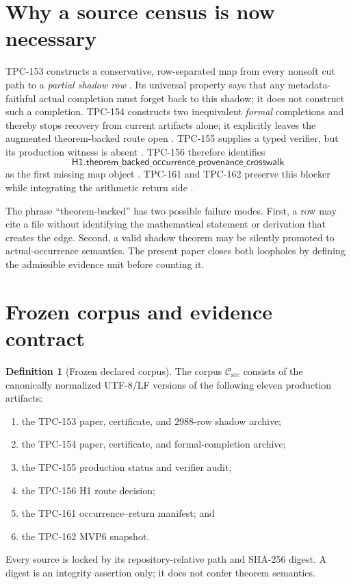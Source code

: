 \documentclass[11pt]{article}
\theoremstyle{definition}
\newtheorem{definition}[theorem]{Definition}
\theoremstyle{remark}
\newcommand{\Csrc}{\mathcal C_{\mathrm{src}}}
\begin{document}
\section{Why a source census is now necessary}

TPC-153 constructs a conservative, row-separated map from every
nonsoft cut path to a \emph{partial shadow row}
\citep{WangTPC153}.  Its universal property says that any
metadata-faithful actual completion must forget back to this shadow;
it does not construct such a completion.  TPC-154 constructs two
inequivalent \emph{formal} completions and thereby stops recovery from
current artifacts alone; it explicitly leaves the augmented
theorem-backed route open \citep{WangTPC154}.  TPC-155 supplies a typed
verifier, but its production witness is absent
\citep{WangTPC155}.  TPC-156 therefore identifies
\[
 \mathsf{H1.theorem\_backed\_occurrence\_provenance\_crosswalk}
 \tag{1.1}\label{eq:first-missing}
\]
as the first missing map object \citep{WangTPC156}.  TPC-161 and
TPC-162 preserve this blocker while integrating the arithmetic return
side \citep{WangTPC161,WangTPC162}.

The phrase ``theorem-backed'' has two possible failure modes.  First,
a row may cite a file without identifying the mathematical statement
or derivation that creates the edge.  Second, a valid shadow theorem
may be silently promoted to actual-occurrence semantics.  The present
paper closes both loopholes by defining the admissible evidence unit
before counting it.

\section{Frozen corpus and evidence contract}

\begin{definition}[Frozen declared corpus]\label{def:corpus}
The corpus \(\Csrc\) consists of the canonically normalized UTF-8/LF
versions of the following eleven production artifacts:
\begin{enumerate}[leftmargin=2.1em]
 \item the TPC-153 paper, certificate, and \(2988\)-row shadow archive;
 \item the TPC-154 paper, certificate, and formal-completion archive;
 \item the TPC-155 production status and verifier audit;
 \item the TPC-156 H1 route decision;
 \item the TPC-161 occurrence--return manifest; and
 \item the TPC-162 MVP6 snapshot.
\end{enumerate}
Every source is locked by its repository-relative path and SHA-256
digest.  A digest is an integrity assertion only; it does not confer
theorem semantics.
\end{definition}
\end{document}
